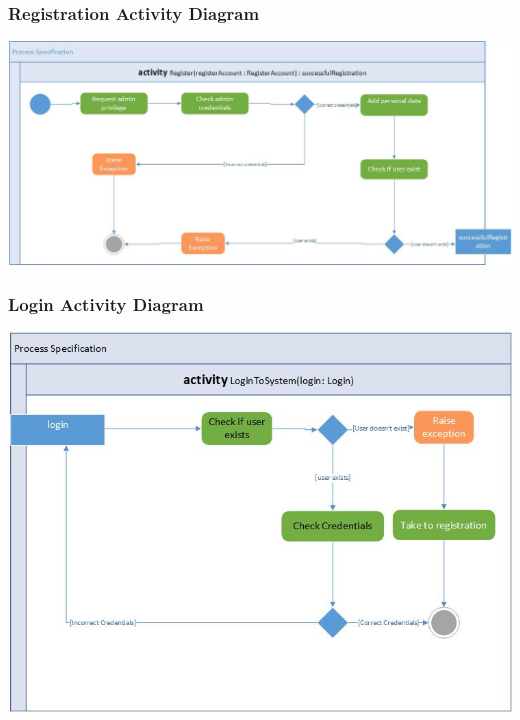 \documentclass[a4paper,12pt]{article}
\begin{document}
	\subsubsection{Registration Activity Diagram}
	\includegraphics[width=1\textwidth]{./Activity_Register.jpg}\\[1.5cm]
	 
	\subsubsection{Login Activity Diagram}
	\includegraphics[width=1\textwidth]{./activity_login.jpg}\\[1.5cm] 
	
\end{document}
